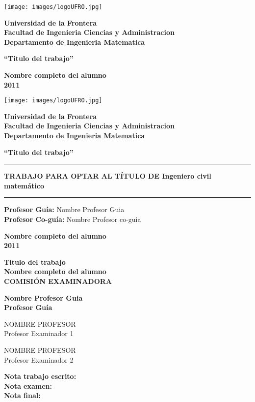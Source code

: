 \documentclass[letterpaper, 12pt]{article}
\newcommand\universidad{Universidad de la Frontera}
\newcommand\facultad{Facultad de Ingenieria Ciencias y Administracion}
\newcommand\departamento{Departamento de Ingenieria Matematica}
\newcommand\tituloTrabajo{Titulo del trabajo}
\newcommand\nombrecompleto{nombre completo del alumno}
\newcommand\annotrabajo{2011}
\newcommand\titulocarrera{Ingeniero civil matemático}
\newcommand\profesorguia{Nombre Profesor Guia}
\newcommand\profesorcoguia{Nombre Profesor co-guia}
\newcommand\footer{
\begin{minipage}[b]{\textwidth}
\begin{center}
		\textbf{
			\MakeUppercase\nombrecompleto\\
			\annotrabajo
		}
\end{center}
\end{minipage}
}
\newcommand\header{
\begin{minipage}{0.1\textwidth}
\texttt{[image: images/logoUFRO.jpg]}
\end{minipage}
\hfill
\begin{minipage}{0.9\textwidth}
\begin{center}
	\textbf{
		\MakeUppercase\universidad\\
		\MakeUppercase\facultad\\
		\MakeUppercase\departamento
	}
\end{center}	
\end{minipage}
}
\newcommand\boxtitle{
\begin{minipage}{\textwidth}
	\begin{center}
		\textbf{ ``\tituloTrabajo''}
	\end{center}
\end{minipage}
}
\begin{document}



\begin{titlepage}
	\header	
	\vfill
	\boxtitle
	\vfill
	\footer
\end{titlepage}

\newpage

\header
\vfill
\boxtitle
\vfill
\hfill
\begin{minipage}{0.6\textwidth}
\begin{center}
	\rule[0mm]{\textwidth}{1mm}
	\textbf{TRABAJO PARA OPTAR AL TÍTULO \newline
	DE \MakeUppercase\titulocarrera \newline}
	\rule[2mm]{\textwidth}{1mm}
\end{center}
\end{minipage}
\vfill
\begin{minipage}{\textwidth}
\begin{flushright}
\textbf{Profesor Guía:} \profesorguia \\
\textbf{Profesor Co-guía:} \profesorcoguia
\end{flushright}
\end{minipage}
\vfill
\footer


\newpage
\begin{minipage}{\textwidth}
\begin{center}
\textbf{
	\MakeUppercase\tituloTrabajo \\
	\MakeUppercase\nombrecompleto \\
	COMISIÓN EXAMINADORA
}
\end{center}
\end{minipage}
\vfill

\begin{minipage}{\textwidth}
\begin{center}
\textbf{
	\MakeUppercase\profesorguia \\
	Profesor Guía
}
\end{center}
\end{minipage}

\vfill

\begin{minipage}{0.5\textwidth}
\begin{center}
NOMBRE PROFESOR \\
Profesor Examinador 1
\end{center}
\end{minipage}
\hfill
\begin{minipage}{0.5\textwidth}
\begin{center}
NOMBRE PROFESOR \\
Profesor Examinador 2
\end{center}
\end{minipage}

\vfill
\hfill
\begin{minipage}{0.5\textwidth}
\begin{flushleft}
\textbf{ Nota trabajo escrito: \\
	Nota examen: \\
	Nota final: \\
}
\end{flushleft}
\end{minipage}


\end{document}
